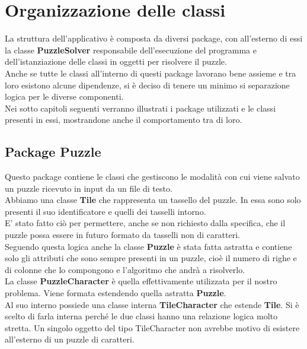 % 
%
%

\section{Organizzazione delle classi}
La struttura dell'applicativo è composta da diversi package, con all'esterno di essi la classe \textbf{PuzzleSolver} responsabile dell'esecuzione del programma e dell'istanziazione delle classi in oggetti per risolvere il puzzle. \\
Anche se tutte le classi all'interno di questi package lavorano bene assieme e tra loro esistono alcune dipendenze, si è deciso di tenere un minimo si separazione logica per le diverse componenti. \\
Nei sotto capitoli seguenti  verranno illustrati i package utilizzati e le classi presenti in essi, mostrandone anche il comportamento tra di loro.

	\subsection{Package Puzzle}
Questo package contiene le classi che gestiscono le modalità con cui viene salvato un puzzle ricevuto in input da un file di testo. \\
Abbiamo una classe \textbf{Tile} che rappresenta un tassello del puzzle. In essa sono solo presenti il suo identificatore e quelli dei tasselli intorno. \\
E' stato fatto ciò per permettere, anche se non richiesto dalla specifica, che il puzzle possa essere in futuro formato da tasselli non di caratteri. \\
Seguendo questa logica anche la classe \textbf{Puzzle} è stata fatta astratta e contiene solo gli attributi che sono sempre presenti in un puzzle, cioè il numero di righe e di colonne che lo compongono e l'algoritmo che andrà a risolverlo. \\
La classe \textbf{PuzzleCharacter} è quella effettivamente utilizzata per il nostro problema. Viene formata estendendo quella astratta \textbf{Puzzle}. \\
Al suo interno possiede una classe interna \textbf{TileCharacter} che estende \textbf{Tile}. Si è scelto di farla interna perché le due classi hanno una relazione logica molto stretta. Un singolo oggetto del tipo TileCharacter non avrebbe motivo di esistere all'esterno di un puzzle di caratteri. \\


